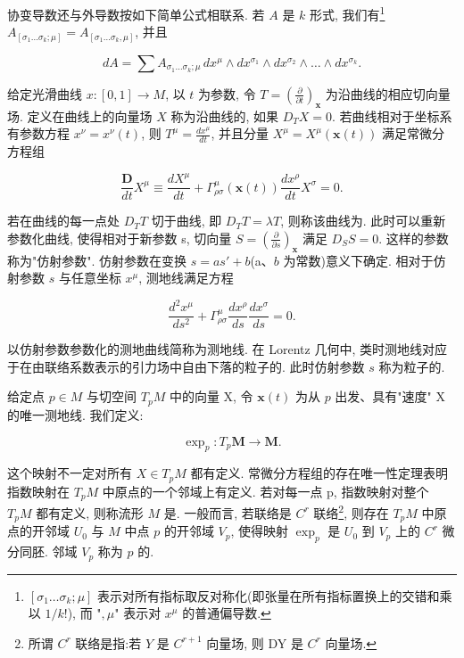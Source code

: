 协变导数还与外导数按如下简单公式相联系. 若 $A$ 是 $k$ 形式, 我们有\footnote{$[\sigma_1\ldots\sigma_k;\mu]$ 表示对所有指标取反对称化(即张量在所有指标置换上的交错和乘以 $1/k!$), 而 "$, \mu$" 表示对 $x^{\mu}$ 的普通偏导数.}$A_{[\sigma_{1}\ldots\sigma_{k};\mu]} = A_{[\sigma_{1}\ldots\sigma_{k}, \mu]}$, 并且

\[
dA = \sum A_{\sigma_{1}\dots\sigma_{k};\mu}\, dx^{\mu} \wedge dx^{\sigma_{1}} \wedge dx^{\sigma_{2}} \wedge \dots \wedge dx^{\sigma_{k}}.
\]

给定光滑曲线 $x : [0, 1] \to M$, 以 $t$ 为参数, 令 $T = \left(\frac{\partial}{\partial t}\right)_{\mathbf{x}}$ 为沿曲线的相应切向量场. 定义在曲线上的向量场 $X$ 称为沿曲线的, 如果 $D_{T}X = 0$. 若曲线相对于坐标系有参数方程 $x^{\nu} = x^{\nu}(t)$, 则 $T^{\mu} = \frac{dx^{\mu}}{dt}$, 并且分量 $X^{\mu} = X^{\mu}(\mathbf{x}(t))$ 满足常微分方程组

\[
\frac{\mathbf{D}}{dt}X^{\mu} \equiv \frac{dX^{\mu}}{dt} + \Gamma^{\mu}_{\rho\sigma}(\mathbf{x}(t))\frac{dx^{\rho}}{dt}X^{\sigma} = 0.
\]

若在曲线的每一点处 $D_{T}T$ 切于曲线, 即 $D_{T}T = \lambda T$, 则称该曲线为. 此时可以重新参数化曲线, 使得相对于新参数 s, 切向量 $S = \left(\frac{\partial}{\partial s}\right)_{\mathbf{x}}$ 满足 $D_{S}S = 0$. 这样的参数称为"仿射参数". 仿射参数在变换 $s = as' + b$(a、$b$ 为常数)意义下确定. 相对于仿射参数 $s$ 与任意坐标 $x^{\mu}$, 测地线满足方程

\[
\frac{d^{2}x^{\mu}}{ds^{2}} + \Gamma^{\mu}_{\rho\sigma}\frac{dx^{\rho}}{ds}\frac{dx^{\sigma}}{ds} = 0.
\]

以仿射参数参数化的测地曲线简称为测地线. 在 Lorentz 几何中, 类时测地线对应于在由联络系数表示的引力场中自由下落的粒子的. 此时仿射参数 $s$ 称为粒子的.

给定点 $p \in M$ 与切空间 $T_{p}M$ 中的向量 X, 令 $\mathbf{x}(t)$ 为从 $p$ 出发、具有"速度" X 的唯一测地线. 我们定义:

\[
\exp_{p}: T_{p}\mathbf{M} \to \mathbf{M}.
\]

这个映射不一定对所有 $X \in T_{p}M$ 都有定义. 常微分方程组的存在唯一性定理表明指数映射在 $T_{p}M$ 中原点的一个邻域上有定义. 若对每一点 p, 指数映射对整个 $T_{p}M$ 都有定义, 则称流形 $M$ 是. 一般而言, 若联络是 $C^{r}$ 联络\footnote{所谓 $C^{r}$ 联络是指:若 $Y$ 是 $C^{r+1}$ 向量场, 则 DY 是 $C^{r}$ 向量场.}, 则存在 $T_{p}M$ 中原点的开邻域 $U_{0}$ 与 $M$ 中点 $p$ 的开邻域 $V_{p}$, 使得映射 $\exp_{p}$ 是 $U_{0}$ 到 $V_{p}$ 上的 $C^{r}$ 微分同胚. 邻域 $V_{p}$ 称为 $p$ 的.


